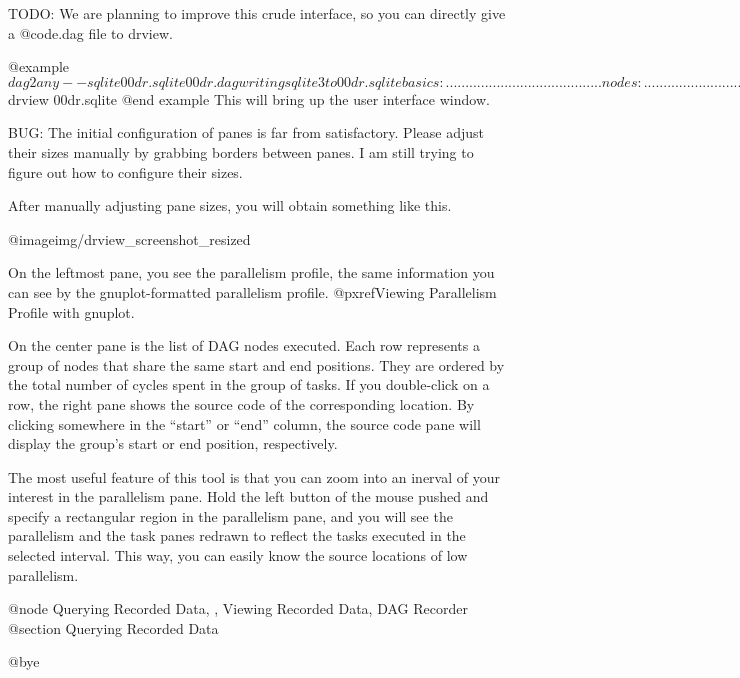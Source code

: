 TODO: We are planning to improve this crude interface, so you can
directly give a @code{.dag} file to drview.

@example
$ dag2any --sqlite 00dr.sqlite 00dr.dag 
writing sqlite3 to 00dr.sqlite
basics:  ........................................
nodes:   ........................................
edges:   ........................................
strings: ........................................
commiting
$ drview 00dr.sqlite
@end example
This will bring up the user interface window.

BUG: The initial configuration of panes is far from satisfactory.
Please adjust their sizes manually by grabbing borders between panes.  I
am still trying to figure out how to configure their sizes.

After manually adjusting pane sizes, you will obtain something like this.

@image{img/drview_screenshot_resized}

On the leftmost pane, you see the parallelism profile, the same
information you can see by the gnuplot-formatted parallelism profile.
@pxref{Viewing Parallelism Profile with gnuplot}. 

On the center pane is the list of DAG nodes executed.  Each row
represents a group of nodes that share the same start and end positions.
They are ordered by the total number of cycles spent in the group of
tasks.  If you double-click on a row, the right pane shows the source
code of the corresponding location.  By clicking somewhere in the
``start'' or ``end'' column, the source code pane will display the
group's start or end position, respectively.

The most useful feature of this tool is that you can zoom into an
inerval of your interest in the parallelism pane.  Hold the left button
of the mouse pushed and specify a rectangular region in the parallelism
pane, and you will see the parallelism and the task panes redrawn to
reflect the tasks executed in the selected interval.  This way, you can
easily know the source locations of low parallelism.

@node Querying Recorded Data,  , Viewing Recorded Data, DAG Recorder
@section Querying Recorded Data


@bye
                                   

